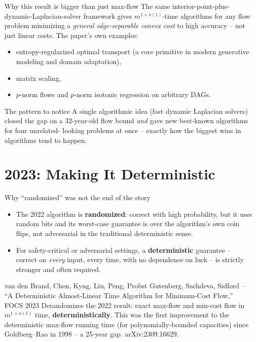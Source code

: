 \documentclass[11pt,aspectratio=169]{beamer}
\begin{document}
\begin{frame}{Why this result is bigger than just max-flow}
  \small
  The same interior-point-plus-dynamic-Laplacian-solver framework gives
  $m^{1+o(1)}$-time algorithms for any flow problem minimizing a \emph{general
  edge-separable convex cost} to high accuracy -- not just linear costs. The paper's
  own examples:
  \begin{itemize}
    \item entropy-regularized optimal transport (a core primitive in modern generative
    modeling and domain adaptation),
    \item matrix scaling,
    \item $p$-norm flows and $p$-norm isotonic regression on arbitrary DAGs.
  \end{itemize}
  \begin{alertblock}{The pattern to notice}
    A single algorithmic idea (fast dynamic Laplacian solvers) closed the gap on a
    32-year-old flow bound \emph{and} gave new best-known algorithms for four unrelated-
    looking problems at once -- exactly how the biggest wins in algorithms tend to
    happen.
  \end{alertblock}
\end{frame}

\section{2023: Making It Deterministic}

\begin{frame}{Why ``randomized'' was not the end of the story}
  \begin{itemize}
    \item The 2022 algorithm is \textbf{randomized}: correct with high probability, but
    it uses random bits and its worst-case guarantee is over the algorithm's own coin
    flips, not adversarial in the traditional deterministic sense.
    \item For safety-critical or adversarial settings, a \textbf{deterministic}
    guarantee -- correct on \emph{every} input, every time, with no dependence on luck
    -- is strictly stronger and often required.
  \end{itemize}
  \begin{block}{van den Brand, Chen, Kyng, Liu, Peng, Probst Gutenberg, Sachdeva, Sidford
  -- ``A Deterministic Almost-Linear Time Algorithm for Minimum-Cost Flow,'' FOCS 2023}
    Derandomizes the 2022 result: exact max-flow and min-cost flow in $m^{1+o(1)}$ time,
    \textbf{deterministically}. This was the first improvement to the deterministic
    max-flow running time (for polynomially-bounded capacities) since Goldberg--Rao in
    1998 -- a 25-year gap. arXiv:2309.16629.
  \end{block}
\end{frame}
\end{document}
